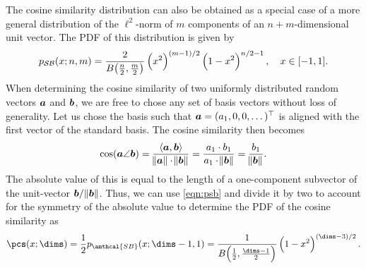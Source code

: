 The cosine similarity distribution can also be obtained as a special case of a more general distribution of the $\ell^2$-norm of $m$ components of an $n+m$-dimensional unit vector.
The PDF of this distribution is given by~\parencite{harman2010,gosmann216}
\begin{equation}
    p_{\mathcal{SB}}(x; n, m) = \frac{2}{B\!\del{\frac{n}{2}, \frac{m}{2}}} \del{x^2}^{(m-1)/2} \del{1 - x^2}^{n/2 - 1},\quad x \in [-1, 1] \text{.}\label{eqn:psb}
\end{equation}
When determining the cosine similarity of two uniformly distributed random vectors $\bm{a}$ and $\bm{b}$, we are free to chose any set of basis vectors without loss of generality.
Let us chose the basis such that $\bm{a} = (a_1, 0, 0, \dots)^{\top}$ is aligned with the first vector of the standard basis.
The cosine similarity then becomes
\begin{equation}
    \cos(\bm{a} \angle \bm{b}) = \frac{\langle \bm{a}, \bm{b} \rangle}{\norm{\bm{a}} \cdot \norm{\bm{b}}} = \frac{a_1 \cdot b_1}{a_1 \cdot \norm{\bm{b}}} = \frac{b_1}{\norm{\bm{b}}} \text{.}
\end{equation}
The absolute value of this is equal to the length of a one-component subvector of the unit-vector $\bm{b}/\norm{\bm{b}}$.
Thus, we can use \cref{eqn:psb} and divide it by two to account for the symmetry of the absolute value to determine the PDF of the cosine similarity as
\begin{equation}
    \pcs(x; \dims) = \frac{1}{2} p_{\amthcal{SB}}(x; \dims - 1, 1) = \frac{1}{B\!\del{\frac{1}{2}, \frac{\dims - 1}{2}}} \del{1 - x^2}^{\del{\dims - 3}/2}\text{.}
\end{equation}
